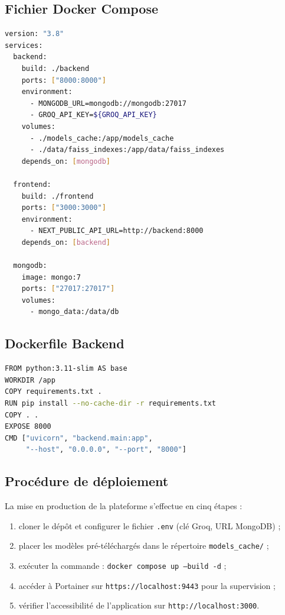\subsection{Fichier Docker Compose}

\begin{lstlisting}[language=bash, caption={docker-compose.yml simplifié}]
version: "3.8"
services:
  backend:
    build: ./backend
    ports: ["8000:8000"]
    environment:
      - MONGODB_URL=mongodb://mongodb:27017
      - GROQ_API_KEY=${GROQ_API_KEY}
    volumes:
      - ./models_cache:/app/models_cache
      - ./data/faiss_indexes:/app/data/faiss_indexes
    depends_on: [mongodb]

  frontend:
    build: ./frontend
    ports: ["3000:3000"]
    environment:
      - NEXT_PUBLIC_API_URL=http://backend:8000
    depends_on: [backend]

  mongodb:
    image: mongo:7
    ports: ["27017:27017"]
    volumes:
      - mongo_data:/data/db
\end{lstlisting}

\subsection{Dockerfile Backend}

\begin{lstlisting}[language=bash, caption={Dockerfile du backend (multi-stage)}]
FROM python:3.11-slim AS base
WORKDIR /app
COPY requirements.txt .
RUN pip install --no-cache-dir -r requirements.txt
COPY . .
EXPOSE 8000
CMD ["uvicorn", "backend.main:app",
     "--host", "0.0.0.0", "--port", "8000"]
\end{lstlisting}

\subsection{Procédure de déploiement}

La mise en production de la plateforme s'effectue en cinq étapes :

\begin{enumerate}
  \item cloner le dépôt et configurer le fichier \texttt{.env} (clé Groq, URL MongoDB) ;
  \item placer les modèles pré-téléchargés dans le répertoire \texttt{models\_cache/} ;
  \item exécuter la commande : \texttt{docker compose up --build -d} ;
  \item accéder à Portainer sur \texttt{https://localhost:9443} pour la supervision ;
  \item vérifier l'accessibilité de l'application sur \texttt{http://localhost:3000}.
\end{enumerate}

